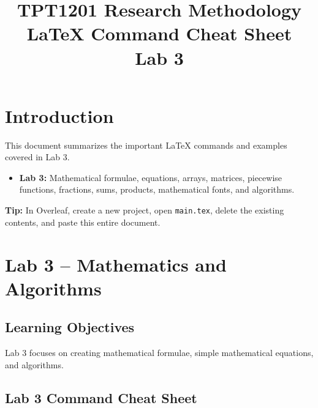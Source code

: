 \documentclass[a4paper,10pt]{article}
\title{\textbf{TPT1201 Research Methodology}\\
LaTeX Command Cheat Sheet\\
\large Lab 3}
\author{}
\date{}
\begin{document}
\maketitle
\tableofcontents
\newpage


\section{Introduction}

This document summarizes the important LaTeX commands and examples
covered in Lab 3.

\begin{itemize}
    \item \textbf{Lab 3:} Mathematical formulae, equations, arrays,
    matrices, piecewise functions, fractions, sums, products,
    mathematical fonts, and algorithms.
\end{itemize}

\textbf{Tip:} In Overleaf, create a new project, open \texttt{main.tex},
delete the existing contents, and paste this entire document.

\newpage


\section{Lab 3 -- Mathematics and Algorithms}

\subsection{Learning Objectives}

Lab 3 focuses on creating mathematical formulae, simple mathematical
equations, and algorithms.


\subsection{Lab 3 Command Cheat Sheet}

\renewcommand{\arraystretch}{1.4}
\end{document}
